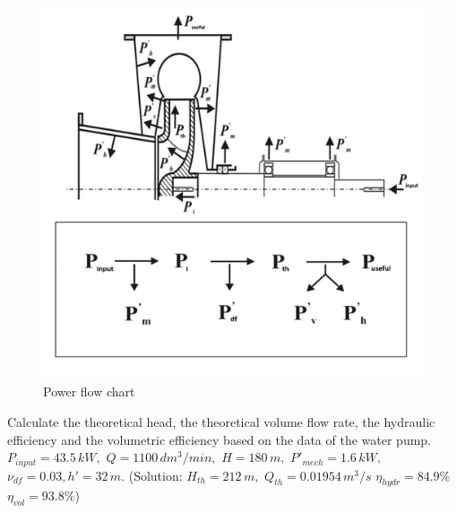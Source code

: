 \begin{figure}[ht]
\begin{center}
\includegraphics[scale=0.85]{figs/problem_2p3p17_pow_flow_chart_fig.png}
\caption{\label{gen_pfc}Power flow chart}
\end{center}
\end{figure}

\vspace{1cm}

Calculate the theoretical head, the theoretical volume flow rate, the hydraulic efficiency and the volumetric efficiency based on the data of the water pump. $P_{input} = 43.5\,kW,$ $Q = 1100\,dm^3/min,$ $H = 180\,m,$ $P'_{mech} = 1.6\,kW,$ $\nu_{df} = 0.03, h' = 32\,m$.
(Solution: $H_{th} = 212\,m,$ $Q_{th} = 0.01954\,m^3/s$ $\eta_{hydr} = 84.9\%$ $ \eta_{vol} = 93.8\%$)